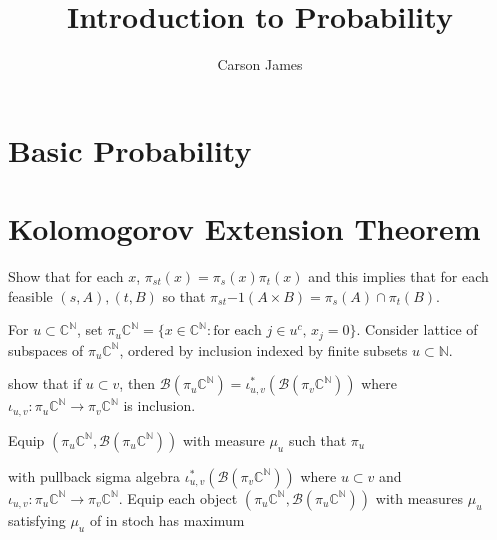 \documentclass[12pt]{amsart}
\theoremstyle{definition}
\newcommand{\C}{\mathbb{C}}
\newcommand{\N}{\mathbb{N}}
\newcommand{\MB}{\mathcal{B}}
\begin{document}
	
	\title{Introduction to Probability}
	\author{Carson James}
	\maketitle
	
	\tableofcontents
	

	
	
	\newpage
	\section{Basic Probability}
	
	
	
	
	
	
	
	
	
	
	
	
	
	
	
	
	
	
	
	
	
	
	
	
	
	
	
	
	
	
	
	
	\section{Kolomogorov Extension Theorem}
	
	Show that for each $x$, $\pi_{st}(x) = \pi_s(x)\pi_t(x)$ and this implies that for each feasible $(s,A), (t, B)$ so that  $\pi_{s t}{-1}(A \times B) = \pi_s(A) \cap \pi_t(B)$.
	
	For $u \subset \C^\N$, set $\pi_u \C^\N = \{x \in \C^\N: \text{for each $j \in u^c$, $x_j = 0$} \}$. Consider lattice of subspaces of $\pi_u \C^\N$, ordered by inclusion indexed by finite subsets $u \subset \N$. 
	
	show that if $u \subset v$, then $\MB(\pi_u \C^\N) = \iota_{u,v}^*(\MB(\pi_v \C^\N))$ where $\iota_{u,v}: \pi_u \C^\N \rightarrow \pi_v \C^\N$ is inclusion.
	
	Equip $(\pi_u \C^\N, \MB(\pi_u \C^\N))$ with measure $\mu_u$ such that $\pi_u$
	
	 with pullback sigma algebra $\iota_{u,v}^*(\MB(\pi_v \C^\N))$ where $u \subset v$ and $\iota_{u,v}: \pi_u \C^\N \rightarrow \pi_v \C^\N$. Equip each object $(\pi_u \C^\N, \MB(\pi_u \C^\N))$ with measures $\mu_u$ satisfying $\mu_u$ of in stoch has maximum 
	
\end{document}
